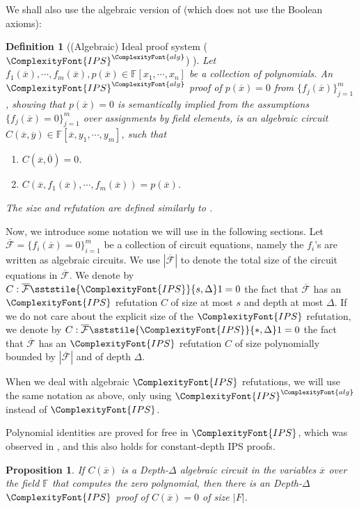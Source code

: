 \documentclass[11pt,letter]{article}
\newtheorem{definition}[theorem]{Definition}
\newtheorem{proposition}[theorem]{Proposition}
\theoremstyle{remark} %
\newcommand{\alg}{\ComplexityFont{alg}}
\newcommand{\IPS}{%
    {
        \ComplexityFont{IPS} 
    }
}
\begin{document}
{    We shall also use the algebraic version of \IPS (which does not use the Boolean axioms):
    \begin{definition}[(Algebraic) Ideal proof system ($\IPS^{\alg}$) \cite{GP18}]
         Let $f_1(\overline{x}),\cdots,f_m(\overline{x}), p(\overline{x})\in \mathbb{F}[x_1,\cdots,x_n]$ be a collection of polynomials. An $\IPS^{\alg}$ proof of $p(\overline{x})=0$ from $\{f_j(\overline{x})\}_{j=1}^m$, showing that $p(\overline{x})=0$ is semantically implied from the assumptions $\{f_j(\overline{x})=0\}_{j=1}^m$ over assignments by field elements, is an algebraic circuit $C(\overline{x},\overline{y}) \in \mathbb{F}[\overline{x}, y_1,\cdots,y_m]$, such that 
        \begin{enumerate}
            \item $C(\overline{x},\overline{0})=0$.
            \item $C(\overline{x},f_1(\overline{x}), \cdots, f_m(\overline{x}))=p(\overline{x})$.
        \end{enumerate}
       The size and refutation are defined similarly to .
    \end{definition}

    
    Now, we introduce some notation we will use in the following sections. Let $\overline{\mathcal{F}}=\{f_i(\overline{x})=0\}_{i=1}^m$ be a collection of circuit equations, namely the $f_i$'s are written as algebraic circuits. We use $|\overline{\mathcal{F}}|$ to denote the total size of the circuit equations in $\overline{\mathcal{F}}$. We denote by $C: \overline{\mathcal{F}} \sststile{\IPS}{s,\Delta} 1=0$ the fact that $\overline{\mathcal{F}}$ has an $\IPS$ refutation $C$ of size at most $s$ and depth at most $\Delta$. If we do not care about the explicit size of the $\IPS$ refutation, we denote by $C: \overline{\mathcal{F}} \sststile{\IPS}{\ast, \Delta} 1=0$ the fact that $\overline{\mathcal{F}}$ has an $\IPS$ refutation $C$ of size polynomially bounded by $|\overline{\mathcal{F}}|$ and of depth $\Delta$.\par
    
    When we deal with algebraic $\IPS$ refutations, we will use the same notation as above, only using $\IPS^\alg$ instead of $\IPS$.

    Polynomial identities are proved for free in $\IPS$, which was observed in \cite{AGHT24}, and this also holds for constant-depth IPS proofs.

    \begin{proposition}
        \label{prop: polynomial identities that can be written as constant-depth circuits are proved for free in constant-depth IPS}
        If $C(\overline{x})$ is a Depth-$\Delta$ algebraic circuit in the variables $\overline{x}$ over the field $\mathbb{F}$ that computes the zero polynomial, then there is an Depth-$\Delta$ $\IPS$ proof of $C(\overline{x})=0$ of size $|F|$.
    \end{proposition}

}
\end{document}
